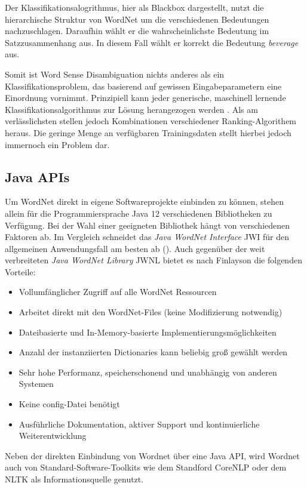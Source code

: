 \par
Der Klassifikationsalogrithmus, hier als Blackbox dargestellt, nutzt die hierarchische Struktur von WordNet um die verschiedenen Bedeutungen nachzuschlagen. Daraufhin wählt er die wahrscheinlichste Bedeutung im Satzzusammenhang aus. In diesem Fall wählt er korrekt die Bedeutung \textit{beverage} aus.
\par
Somit ist Word Sense Disambiguation nichts anderes als ein Klassifikationsproblem, das basierend auf gewissen Eingabeparametern eine Einordnung vornimmt. Prinzipiell kann jeder generische, maschinell lernende Klassifikationsalgorithmus zur Lösung herangezogen werden \cite[vgl.][326]{YAROWSKY}. Als am verlässlichsten stellen jedoch Kombinationen verschiedener Ranking-Algorithem heraus. Die geringe Menge an verfügbaren Trainingsdaten stellt hierbei jedoch immernoch ein Problem dar.


\subsection{Java APIs}

Um WordNet direkt in eigene Softwareprojekte einbinden zu können, stehen allein für die Programmiersprache Java 12 verschiedenen Bibliotheken zu Verfügung. Bei der Wahl einer geeigneten Bibliothek hängt von verschiedenen Faktoren ab. Im Vergleich schneidet das \textit{Java WordNet Interface} \ac{JWI} für den allgemeinen Anwendungsfall am besten ab (\cite[vgl.][2]{FINLAYSON}). Auch gegenüber der weit verbreiteten \textit{Java WordNet Library} \ac{JWNL} bietet es nach Finlayson die folgenden Vorteile:

\begin{itemize} 
\item Vollumfänglicher Zugriff auf alle WordNet Ressourcen
\item Arbeitet direkt mit den WordNet-Files (keine Modifizierung notwendig)
\item Dateibasierte und In-Memory-basierte Implementierungsmöglichkeiten
\item Anzahl der instanziierten Dictionaries kann beliebig groß gewählt werden
\item Sehr hohe Performanz, speicherschonend und unabhängig von anderen Systemen
\item Keine config-Datei benötigt 
\item Ausführliche Dokumentation, aktiver Support und kontinuierliche Weiterentwicklung
\end{itemize}

Neben der direkten Einbindung von Wordnet über eine Java API, wird Wordnet auch von Standard-Software-Toolkits wie dem Standford CoreNLP oder dem NLTK als Informationsquelle genutzt.